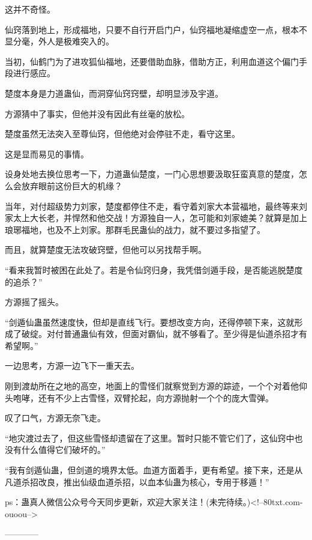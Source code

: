 \begin{this_body}
这并不奇怪。

仙窍落到地上，形成福地，只要不自行开启门户，仙窍福地凝缩虚空一点，根本不显分毫，外人是极难突入的。

当初，仙鹤门为了进攻狐仙福地，还要借助血脉，借助方正，利用血道这个偏门手段进行感应。

楚度本身是力道蛊仙，而洞穿仙窍窍壁，却明显涉及宇道。

方源猜中了事实，但他并没有因此有丝毫的放松。

楚度虽然无法突入至尊仙窍，但他绝对会停驻不走，看守这里。

这是显而易见的事情。

设身处地去换位思考一下，力道蛊仙楚度，一门心思想要汲取狂蛮真意的楚度，怎么会放弃眼前这份巨大的机缘？

当年，对付超级势力刘家，楚度都停住不走，看守着刘家大本营福地，最终等来刘家太上大长老，并悍然和他交战！方源独自一人，怎可能和刘家媲美？就算是加上琅琊福地，也及不上刘家。那群毛民蛊仙的战力，就不要过多指望了。

而且，就算楚度无法攻破窍壁，但他可以另找帮手啊。

“看来我暂时被困在此处了。若是令仙窍归身，我凭借剑遁手段，是否能逃脱楚度的追杀？”

方源摇了摇头。

“剑遁仙蛊虽然速度快，但却是直线飞行。要想改变方向，还得停顿下来，这就形成了破绽。对付普通蛊仙有效，但面对霸仙，就不够看了。至少得是仙道杀招才有希望啊。”

一边思考，方源一边飞下一重天去。

刚到渡劫所在之地的高空，地面上的雪怪们就察觉到方源的踪迹，一个个对着他仰头咆哮，还有不少上古雪怪，双臂抡起，向方源抛射一个个的庞大雪弹。

叹了口气，方源无奈飞走。

“地灾渡过去了，但这些雪怪却遗留在了这里。暂时只能不管它们了，这仙窍中也没有什么值得它们破坏的。”

“我有剑遁仙蛊，但剑道的境界太低。血道方面着手，更有希望。接下来，还是从凡道杀招改良，推出仙级血道杀招，以血本仙蛊为核心，专用于移遁！”

ps：蛊真人微信公众号今天同步更新，欢迎大家关注！(未完待续。)<!--80txt.com-ouoou-->

------------

\end{this_body}

